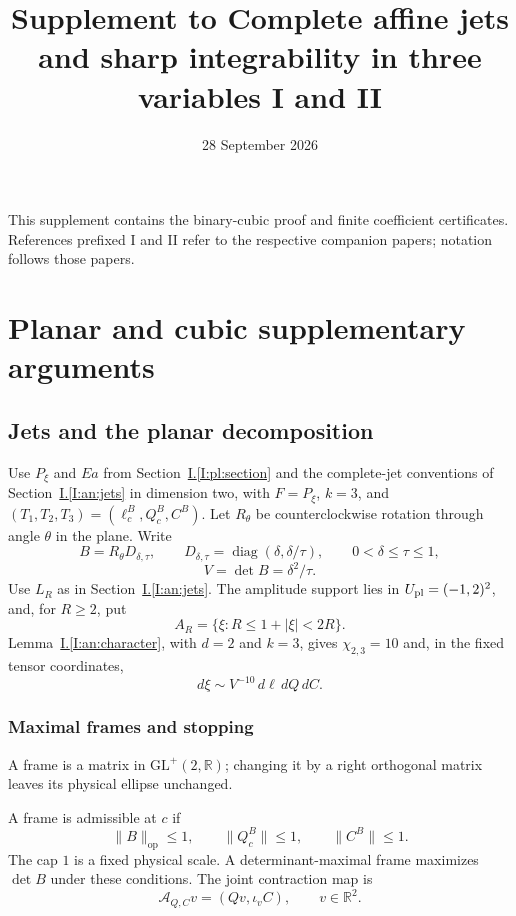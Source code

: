 \documentclass[11pt]{amsart}
\title[Supplement: complete affine jets]{Supplement to Complete affine jets and sharp integrability in three variables I and II}
\author{}
\date{28 September 2026}
\theoremstyle{definition}
\theoremstyle{remark}
\newcommand{\R}{\mathbb R}
\numberwithin{equation}{section}
\newcommand{\partIref}[1]{\hyperref[I:#1]{I.\ref*{I:#1}}}
\begin{document}
\maketitle
This supplement contains the binary-cubic proof and finite coefficient certificates. References prefixed I and II refer to the respective companion papers; notation follows those papers.
\tableofcontents

\section{Planar and cubic supplementary arguments}

\subsection{Jets and the planar decomposition}\label{pl:jet-calculus}
Use $P_\xi$ and $Ea$ from Section~\partIref{pl:section} and the complete-jet conventions of Section~\partIref{an:jets} in dimension two, with $F=P_\xi$, $k=3$, and $(T_1,T_2,T_3)=(\ell_c^B,Q_c^B,C^B)$. Let $R_\theta$ be counterclockwise rotation through angle $\theta$ in the plane. Write
\begin{equation}\label{pl:B-delta-tau}
B=R_\theta D_{\delta,\tau},\qquad D_{\delta,\tau}=\operatorname{diag}(\delta,\delta/\tau),\qquad 0<\delta\le\tau\le1,
\end{equation}
\begin{equation}\label{pl:packet-area}
V=\det B=\delta^2/\tau.
\end{equation}
Use $L_R$ as in Section~\partIref{an:jets}. The amplitude support lies in $U_{\rm pl}=(-1,2)^2$, and, for $R\ge2$, put
\begin{equation}\label{pl:annulus}
A_R=\{\xi:R\le1+|\xi|<2R\}.
\end{equation}
Lemma~\partIref{an:character}, with $d=2$ and $k=3$, gives $\chi_{2,3}=10$ and, in the fixed tensor coordinates,
\begin{equation}\label{pl:jet-measure}
d\xi\sim V^{-10}\,d\ell\,dQ\,dC.
\end{equation}

\subsubsection{Maximal frames and stopping}\label{pl:maximal-frames}
A frame is a matrix in $\mathrm{GL}^+(2,\R)$; changing it by a right orthogonal matrix leaves its physical ellipse unchanged.

A frame is admissible at $c$ if
\begin{equation}\label{pl:admissible-frame}
\|B\|_{\mathrm{op}}\le1,\qquad \|Q_c^B\|\le1,\qquad \|C^B\|\le1.
\end{equation}
The cap $1$ is a fixed physical scale. A determinant-maximal frame maximizes $\det B$ under these conditions. The joint contraction map is
\begin{equation}\label{pl:contraction-map}
\mathcal A_{Q,C}v=(Qv,\iota_vC),\qquad v\in\R^2.
\end{equation}
\end{document}
